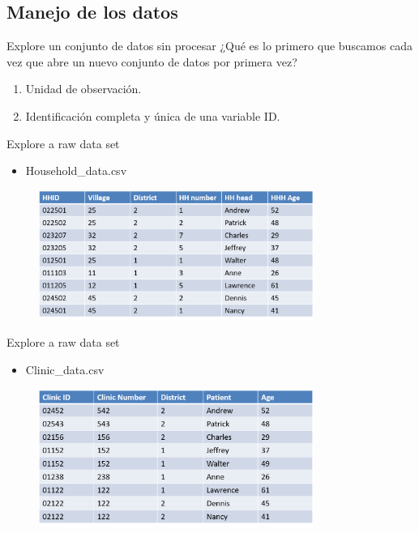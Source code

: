 \documentclass[11pt, aspectratio=169, compress]{beamer}
\begin{document}
\subsection{Manejo de los datos}
\begin{frame}{Explore un conjunto de datos sin procesar}
	¿Qué es lo primero que buscamos cada vez que abre un nuevo conjunto de datos por primera vez?

	\begin{enumerate}
		\item Unidad de observación.
		\item Identificación completa y única de una variable ID. 
	\end{enumerate}
\end{frame}
\begin{frame}{Explore a raw data set}
	\begin{itemize}
		\item Household\_data.csv
	\end{itemize}
	\begin{figure}[H]
		\centering
		\includegraphics[width=0.8\textwidth]{hh_data.png}
	\end{figure}
\end{frame}
\begin{frame}{Explore a raw data set}
	\begin{itemize}
		\item Clinic\_data.csv
	\end{itemize}
	\begin{figure}[H]
		\centering
		\includegraphics[width=0.8\textwidth]{clinic_data.png}
	\end{figure}
\end{frame}
\end{document}
